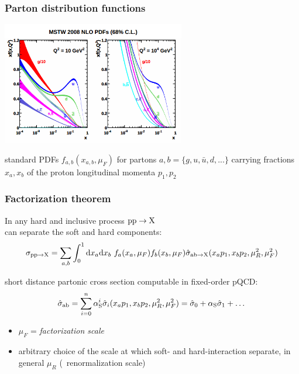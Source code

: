 \begin{frame}\frametitle{Parton distribution functions}
\centering\small

  \includegraphics[width=0.6\textwidth]{../montecarlo/figures/pdfs2.png}

\myskip
standard PDFs $f_{a,b}(x_{a,b},\mu_{F})$ 
for partons $a,b = \{g,u,\bar{u},d,...\}$ 
 carrying fractions $x_a,x_b$ of the proton longitudinal momenta
$p_1, p_2$
\end{frame}



\begin{frame}\frametitle{Factorization theorem}
\centering\myskip

In any {\cccolor hard and inclusive} process ${\rm pp}\to{\rm X}$\\
can separate the {\cccolor soft} and {\cccolor hard} components:
$$
  \sigma_{{\rm pp}\to{\rm X}}
  = \sum_{a,b}
  \int_{0}^{1}{\rm d}x_a{\rm d}x_b
  ~ f_a(x_a,\mu_{F}) f_b(x_b,\mu_{F})
  \hat{\sigma}_{{\rm ab}\to{\rm X}}(x_ap_1, x_bp_2,\mu_R^2,\mu_{F}^2)
$$

short distance partonic cross section computable in fixed-order pQCD:
$$\hat{\sigma}_{{\rm ab}}=\sum_{i=0}^{n} \alphas^i \hat{\sigma}_i(x_ap_1, x_bp_2,\mu_R^2,\mu_{F}^2)=\hat{\sigma}_0+\alphas \hat{\sigma}_1+\dots$$

\begin{itemize}
\item $\mu_{F}$ = {\it factorization scale} 
\item arbitrary choice of the scale at which soft- and hard-interaction separate, in general $\mu_{R}$ (\alphas\ renormalization scale)
\end{itemize}

\end{frame}



